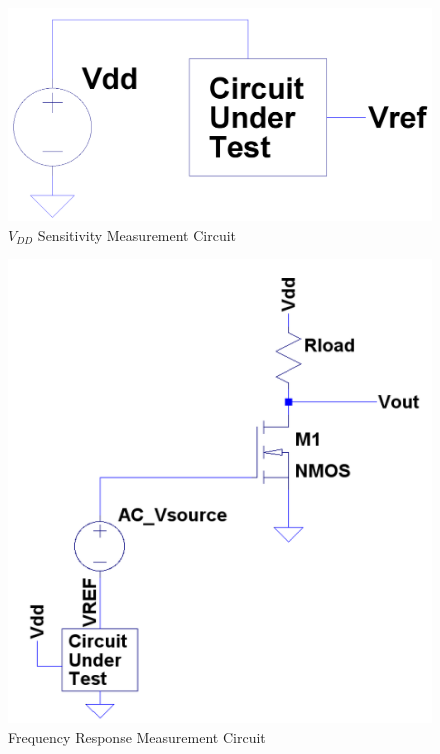 \documentclass[conference]{IEEEtran}
\begin{document}
\begin{figure}[!htbp]
  	\centering
  	\includegraphics[scale=0.15]{images/sensitivity-meas.png}
  	\caption[sensitivity-meas]{$V_{DD}$ Sensitivity Measurement Circuit}
  	\label{fig:sensitiviy-meas}
	\end{figure}

\begin{figure}[!htbp]
  	\centering
  	\includegraphics[scale=0.25]{images/fr-meas.png}
  	\caption[fr-meas]{Frequency Response Measurement Circuit}
  	\label{fig:fr-meas}
	\end{figure}
\end{document}
